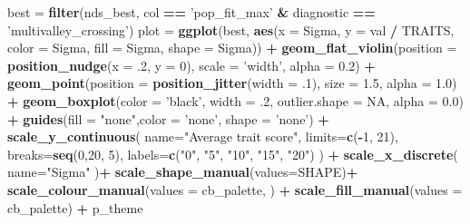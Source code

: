 \documentclass[]{book}
\newenvironment{Shaded}{\begin{snugshade}}{\end{snugshade}}
\newcommand{\DataTypeTok}[1]{\textcolor[rgb]{0.13,0.29,0.53}{#1}}
\newcommand{\DecValTok}[1]{\textcolor[rgb]{0.00,0.00,0.81}{#1}}
\newcommand{\FloatTok}[1]{\textcolor[rgb]{0.00,0.00,0.81}{#1}}
\newcommand{\KeywordTok}[1]{\textcolor[rgb]{0.13,0.29,0.53}{\textbf{#1}}}
\newcommand{\NormalTok}[1]{#1}
\newcommand{\OperatorTok}[1]{\textcolor[rgb]{0.81,0.36,0.00}{\textbf{#1}}}
\newcommand{\OtherTok}[1]{\textcolor[rgb]{0.56,0.35,0.01}{#1}}
\newcommand{\StringTok}[1]{\textcolor[rgb]{0.31,0.60,0.02}{#1}}
\begin{document}
\begin{Shaded}
\begin{Highlighting}[]
\NormalTok{best =}\StringTok{ }\KeywordTok{filter}\NormalTok{(nds_best, col }\OperatorTok{==}\StringTok{ 'pop_fit_max'} \OperatorTok{&}\StringTok{ }\NormalTok{diagnostic }\OperatorTok{==}\StringTok{ 'multivalley_crossing'}\NormalTok{)}
\NormalTok{plot =}\StringTok{  }\KeywordTok{ggplot}\NormalTok{(best, }\KeywordTok{aes}\NormalTok{(}\DataTypeTok{x =}\NormalTok{ Sigma, }\DataTypeTok{y =}\NormalTok{ val }\OperatorTok{/}\StringTok{ }\NormalTok{TRAITS, }\DataTypeTok{color =}\NormalTok{ Sigma, }\DataTypeTok{fill =}\NormalTok{ Sigma, }\DataTypeTok{shape =}\NormalTok{ Sigma)) }\OperatorTok{+}
\StringTok{          }\KeywordTok{geom_flat_violin}\NormalTok{(}\DataTypeTok{position =} \KeywordTok{position_nudge}\NormalTok{(}\DataTypeTok{x =} \FloatTok{.2}\NormalTok{, }\DataTypeTok{y =} \DecValTok{0}\NormalTok{), }\DataTypeTok{scale =} \StringTok{'width'}\NormalTok{, }\DataTypeTok{alpha =} \FloatTok{0.2}\NormalTok{) }\OperatorTok{+}
\StringTok{          }\KeywordTok{geom_point}\NormalTok{(}\DataTypeTok{position =} \KeywordTok{position_jitter}\NormalTok{(}\DataTypeTok{width =} \FloatTok{.1}\NormalTok{), }\DataTypeTok{size =} \FloatTok{1.5}\NormalTok{, }\DataTypeTok{alpha =} \FloatTok{1.0}\NormalTok{) }\OperatorTok{+}
\StringTok{          }\KeywordTok{geom_boxplot}\NormalTok{(}\DataTypeTok{color =} \StringTok{'black'}\NormalTok{, }\DataTypeTok{width =} \FloatTok{.2}\NormalTok{, }\DataTypeTok{outlier.shape =} \OtherTok{NA}\NormalTok{, }\DataTypeTok{alpha =} \FloatTok{0.0}\NormalTok{) }\OperatorTok{+}
\StringTok{          }\KeywordTok{guides}\NormalTok{(}\DataTypeTok{fill =} \StringTok{"none"}\NormalTok{,}\DataTypeTok{color =} \StringTok{'none'}\NormalTok{, }\DataTypeTok{shape =} \StringTok{'none'}\NormalTok{) }\OperatorTok{+}
\StringTok{          }\KeywordTok{scale_y_continuous}\NormalTok{(}
            \DataTypeTok{name=}\StringTok{"Average trait score"}\NormalTok{,}
            \DataTypeTok{limits=}\KeywordTok{c}\NormalTok{(}\OperatorTok{-}\DecValTok{1}\NormalTok{, }\DecValTok{21}\NormalTok{),}
            \DataTypeTok{breaks=}\KeywordTok{seq}\NormalTok{(}\DecValTok{0}\NormalTok{,}\DecValTok{20}\NormalTok{, }\DecValTok{5}\NormalTok{),}
            \DataTypeTok{labels=}\KeywordTok{c}\NormalTok{(}\StringTok{"0"}\NormalTok{, }\StringTok{"5"}\NormalTok{, }\StringTok{"10"}\NormalTok{, }\StringTok{"15"}\NormalTok{, }\StringTok{"20"}\NormalTok{)}
\NormalTok{          ) }\OperatorTok{+}
\StringTok{          }\KeywordTok{scale_x_discrete}\NormalTok{(}
            \DataTypeTok{name=}\StringTok{"Sigma"}
\NormalTok{          )}\OperatorTok{+}
\StringTok{          }\KeywordTok{scale_shape_manual}\NormalTok{(}\DataTypeTok{values=}\NormalTok{SHAPE)}\OperatorTok{+}
\StringTok{          }\KeywordTok{scale_colour_manual}\NormalTok{(}\DataTypeTok{values =}\NormalTok{ cb_palette, ) }\OperatorTok{+}
\StringTok{          }\KeywordTok{scale_fill_manual}\NormalTok{(}\DataTypeTok{values =}\NormalTok{ cb_palette) }\OperatorTok{+}
\StringTok{          }\NormalTok{p_theme}


\end{Highlighting}
\end{Shaded}
\end{document}

